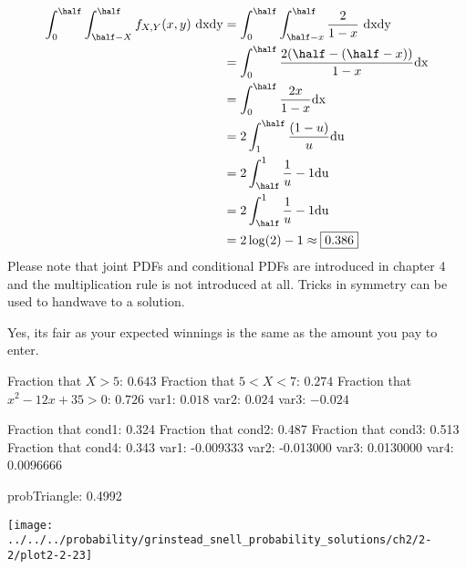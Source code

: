\begin{oddenumerate}
\begin{align*}
	 		 \displaystyle \int_0^{\half} \int_{\half - X}^{\half} f_{X,Y}(x,y) \textrm{ dxdy} &= \displaystyle \int_0^{\half} \int_{\half - x}^{\half} \frac{2}{1-x}  \textrm{ dxdy}   
	 		 \\ &= \int_0^\half \dfrac{2(\half - (\half - x))}{1 - x} \textrm{dx}
			 \\ &= \int_0^\half \dfrac{2x}{1 - x} \textrm{dx}
			 \\ &= 2\int_1^\half \dfrac{(1 - u)}{u} \textrm{du}
			 \\ &= 2\int_\half^1 \dfrac{1}{u}  - 1\textrm{du}
			  \\ &= 2\int_\half^1 \dfrac{1}{u}  - 1\textrm{du}
			  \\ &= 2\log(2) - 1 \approx \boxed{0.386}
	 \end{align*}
 	Please note that joint PDFs and conditional PDFs are introduced in chapter 4 and the multiplication rule is not introduced at all. Tricks in symmetry can be used to handwave to a solution.
 	\item Yes, its fair as your expected winnings is the same as the amount you pay to enter.
 	\item Fraction that $ X>5 $:  $ 0.643 $
 	Fraction that $ 5<X<7 $:  $ 0.274 $
 	Fraction that $ x^2 - 12x + 35 > 0  $: $  0.726 $
 	var1:  $ 0.018 $
 	var2:  $ 0.024 $
 	var3:  $ -0.024$
 	\item Fraction that cond1:  0.324
 	Fraction that cond2:  0.487
 	Fraction that cond3:  0.513
 	Fraction that cond4:  0.343
 	var1:  -0.009333
 	var2:  -0.013000
 	var3:  0.0130000
 	var4:  0.0096666
 	\item probTriangle:  0.4992
 	\item 
\begin{center}
	\texttt{[image: ../../../probability/grinstead\_snell\_probability\_solutions/ch2/2-2/plot2-2-23]}
\end{center}
\end{oddenumerate}